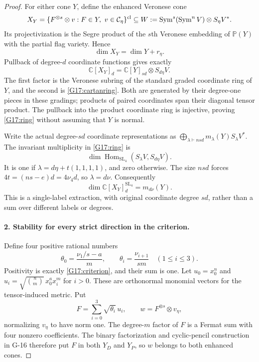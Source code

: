\begin{proof}
For either cone $Y$, define the enhanced Veronese cone
\begin{equation}\label{G17:enhancement}
 X_Y=\{F^{\otimes s}\otimes v:F\in Y,\ v\in\mathcal C_\eta\}^{\rm cl}
 \subseteq W:=\operatorname{Sym}^s(\operatorname{Sym}^n V)
                      \otimes S_\eta V^*.
\end{equation}
Its projectivization is the Segre product of the $s$th Veronese
embedding of $\mathbb P(Y)$ with the partial flag variety. Hence
\begin{equation}\label{G17:dimension}
 \dim X_Y=\dim Y+r_\eta.
\end{equation}
Pullback of degree-$d$ coordinate functions gives exactly
\begin{equation}\label{G17:ring}
 \mathbb C[X_Y]_d=\mathbb C[Y]_{sd}\otimes S_{d\eta}V.
\end{equation}
The first factor is the Veronese subring of the standard graded
coordinate ring of $Y$, and the second is \eqref{G17:cartanring}.
Both are generated by their degree-one pieces in these gradings;
products of paired coordinates span their diagonal tensor product.
The pullback into the product coordinate ring is injective, proving
\eqref{G17:ring} without assuming that $Y$ is normal.

Write the actual degree-$sd$ coordinate representations as
$\bigoplus_{\lambda\vdash nsd}m_\lambda(Y)S_\lambda V^*$.
The invariant multiplicity in \eqref{G17:ring} is
\[
 \dim\operatorname{Hom}_{\mathrm{SL}_4}
                   (S_\lambda V,S_{d\eta}V).
\]
It is one if $\lambda=d\eta+t(1,1,1,1)$, and zero otherwise.
The size $nsd$ forces
$4t=(ns-e)d=4\nu_4d$, so $\lambda=d\nu$.
Consequently
\begin{equation}\label{G17:extraction}
 \dim\mathbb C[X_Y]_d^{\mathrm{SL}_4}=m_{d\nu}(Y).
\end{equation}
This is a single-label extraction, with original coordinate degree
$sd$, rather than a sum over different labels or degrees.

\paragraph{2. Stability for every strict direction in the criterion.}
Define four positive rational numbers
\[
 \theta_0=\frac{\nu_1/s-a}{m},\qquad
 \theta_i=\frac{\nu_{i+1}}{sm}\quad(1\leq i\leq3).
\]
Positivity is exactly \eqref{G17:criterion}, and their sum is one.
Let $u_0=x_0^n$ and
$u_i=\sqrt{\binom nm}\,x_0^a x_i^m$ for $i>0$.
These are orthonormal monomial vectors for the tensor-induced metric.
Put
\[
 F=\sum_{i=0}^3\sqrt{\theta_i}\,u_i,
 \qquad w=F^{\otimes s}\otimes v_\eta,
\]
normalizing $v_\eta$ to have norm one. The degree-$m$ factor of $F$
is a Fermat sum with four nonzero coefficients. The binary factorization
and cyclic-pencil construction in G-16 therefore put $F$ in both
$Y_D$ and $Y_P$, so $w$ belongs to both enhanced cones.


\end{proof}
